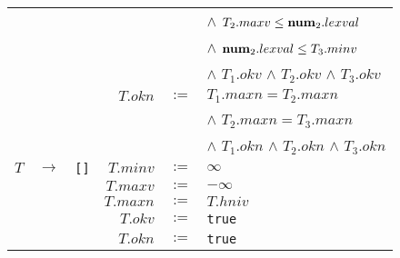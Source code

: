 \documentclass[class=article]{standalone}
\begin{document}
{\begin{tabular}{|rcl|rcl|}
        &               &                                                                                                                                                 &           &      & $\wedge$ $T_2.maxv \leq {\bf num}_2.lexval$ \\
        &               &                                                                                                                                                 &           &      & $\wedge$ ${\bf num}_2.lexval \leq T_3.minv$\\
        &               &                                                                                                                                                 &           &      & $\wedge$ $T_1.okv$ $\wedge$ $T_2.okv$ $\wedge$ $T_3.okv$\\
        &               &                                                                                                                                                 & $T.okn$   & $:=$ & $T_1.maxn = T_2.maxn$\\
        &               &                                                                                                                                                 &           &      & $\wedge$ $T_2.maxn = T_3.maxn$\\
        &               &                                                                                                                                                 &           &      & $\wedge$ $T_1.okn$ $\wedge$ $T_2.okn$ $\wedge$ $T_3.okn$\\
    \hline
    $T$ & $\rightarrow$ & \lstinline[]$[]$  & $T.minv$ & $:=$ & $\infty$\\
        &               &                   & $T.maxv$ & $:=$ & $-\infty$\\
        &               &                   & $T.maxn$ & $:=$ & $T.hniv$\\
        &               &                   & $T.okv$ & $:=$ & \lstinline[]$true$\\
        &               &                   & $T.okn$ & $:=$ & \lstinline[]$true$\\
    \hline
  \end{tabular}
}
\end{document}
